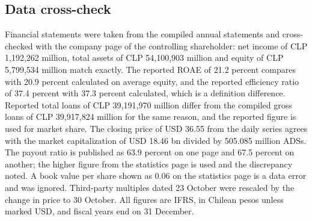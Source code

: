\documentclass[10pt,a4paper]{article}
\begin{document}
\subsection{Data cross-check}
Financial statements were taken from the compiled annual statements and cross-checked with the company page of the controlling shareholder: net income of CLP 1,192,262 million, total assets of CLP 54,100,903 million and equity of CLP 5,799,534 million match exactly. The reported ROAE of 21.2 percent compares with 20.9 percent calculated on average equity, and the reported efficiency ratio of 37.4 percent with 37.3 percent calculated, which is a definition difference. Reported total loans of CLP 39,191,970 million differ from the compiled gross loans of CLP 39,917,824 million for the same reason, and the reported figure is used for market share. The closing price of USD 36.55 from the daily series agrees with the market capitalization of USD 18.46 bn divided by 505.085 million ADSs. The payout ratio is published as 63.9 percent on one page and 67.5 percent on another; the higher figure from the statistics page is used and the discrepancy noted. A book value per share shown as 0.06 on the statistics page is a data error and was ignored. Third-party multiples dated 23 October were rescaled by the change in price to 30 October. All figures are IFRS, in Chilean pesos unless marked USD, and fiscal years end on 31 December.
\end{document}
